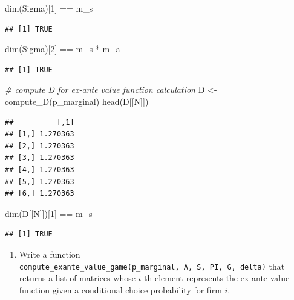 \documentclass[
]{book}
\newenvironment{Shaded}{\begin{snugshade}}{\end{snugshade}}
\newcommand{\CommentTok}[1]{\textcolor[rgb]{0.56,0.35,0.01}{\textit{#1}}}
\newcommand{\DecValTok}[1]{\textcolor[rgb]{0.00,0.00,0.81}{#1}}
\newcommand{\FunctionTok}[1]{\textcolor[rgb]{0.00,0.00,0.00}{#1}}
\newcommand{\NormalTok}[1]{#1}
\newcommand{\OtherTok}[1]{\textcolor[rgb]{0.56,0.35,0.01}{#1}}
\newcommand{\SpecialCharTok}[1]{\textcolor[rgb]{0.00,0.00,0.00}{#1}}
\providecommand{\tightlist}{%
  \setlength{\itemsep}{0pt}\setlength{\parskip}{0pt}}
\begin{document}
\begin{Shaded}
\begin{Highlighting}[]
\FunctionTok{dim}\NormalTok{(Sigma)[}\DecValTok{1}\NormalTok{] }\SpecialCharTok{==}\NormalTok{ m\_s}
\end{Highlighting}
\end{Shaded}

\begin{verbatim}
## [1] TRUE
\end{verbatim}

\begin{Shaded}
\begin{Highlighting}[]
\FunctionTok{dim}\NormalTok{(Sigma)[}\DecValTok{2}\NormalTok{] }\SpecialCharTok{==}\NormalTok{ m\_s }\SpecialCharTok{*}\NormalTok{ m\_a}
\end{Highlighting}
\end{Shaded}

\begin{verbatim}
## [1] TRUE
\end{verbatim}

\begin{Shaded}
\begin{Highlighting}[]
\CommentTok{\# compute D for ex{-}ante value function calculation}
\NormalTok{D }\OtherTok{\textless{}{-}} \FunctionTok{compute\_D}\NormalTok{(p\_marginal)}
\FunctionTok{head}\NormalTok{(D[[N]])}
\end{Highlighting}
\end{Shaded}

\begin{verbatim}
##          [,1]
## [1,] 1.270363
## [2,] 1.270363
## [3,] 1.270363
## [4,] 1.270363
## [5,] 1.270363
## [6,] 1.270363
\end{verbatim}

\begin{Shaded}
\begin{Highlighting}[]
\FunctionTok{dim}\NormalTok{(D[[N]])[}\DecValTok{1}\NormalTok{] }\SpecialCharTok{==}\NormalTok{ m\_s}
\end{Highlighting}
\end{Shaded}

\begin{verbatim}
## [1] TRUE
\end{verbatim}

\begin{enumerate}
\def\labelenumi{\arabic{enumi}.}
\setcounter{enumi}{6}
\tightlist
\item
  Write a function \texttt{compute\_exante\_value\_game(p\_marginal,\ A,\ S,\ PI,\ G,\ delta)} that returns a list of matrices whose \(i\)-th element represents the ex-ante value function given a conditional choice probability for firm \(i\).
\end{enumerate}
\end{document}
